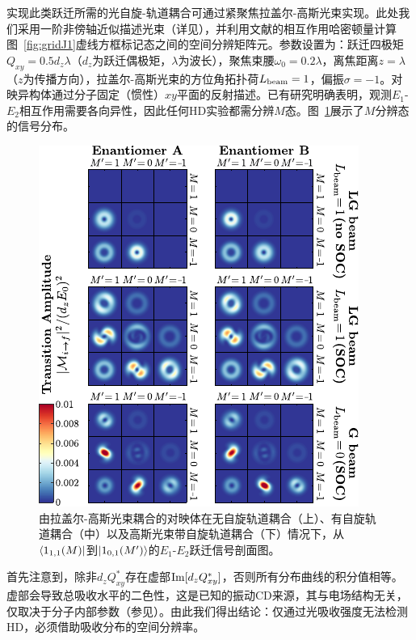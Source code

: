 \documentclass[reprint,aps,prl,twocolumn,superscriptaddress,groupedaddress]{revtex4-2}
\newcommand{\eoet}{$E_1$-$E_2$}
\begin{document}
\begin{CJK*}{UTF8}{gbsn}
实现此类跃迁所需的光自旋-轨道耦合可通过紧聚焦拉盖尔-高斯光束实现\cite{Loeffler2011,Forbes2021nonparaxial,Forbes2021longitudinal}。此处我们采用一阶非傍轴近似描述光束\cite{Lax1975}（详见\cite{Note1}），并利用文献\cite{Maslov2024,Maslov_Thesis}的相互作用哈密顿量计算图~\ref{fig:gridJ1}虚线方框标记态之间的空间分辨矩阵元。参数设置为：跃迁四极矩$Q_{xy}=0.5d_z\lambda$（$d_z$为跃迁偶极矩，$\lambda$为波长），聚焦束腰$\omega_0=0.2\lambda$，离焦距离$z=\lambda$（$z$为传播方向），拉盖尔-高斯光束的方位角拓扑荷$L_{\rm beam}=1$，偏振$\sigma=-1$。对映异构体通过分子固定（惯性）$xy$平面的反射描述。已有研究明确表明\cite{Buckingham1971, Power1975}，观测\eoet 相互作用需要各向异性，因此任何HD实验都需分辨$M$态。图~\ref{fig:profiles}展示了$M$分辨态的信号分布。
\begin{figure}[t!]
    \centering
    \includegraphics[width=1.0\columnwidth]{Figure2.pdf}
    \caption{由拉盖尔-高斯光束耦合的对映体在无自旋轨道耦合（上）、有自旋轨道耦合（中）以及高斯光束带自旋轨道耦合（下）情况下，从$\bra{1_{1,1}(M)}$到$\ket{1_{0,1}(M')}$的\eoet 跃迁信号剖面图。}
    \label{fig:profiles}
\end{figure}
首先注意到，除非$d_zQ_{xy}^*$存在虚部${\rm Im}[d_zQ_{xy}^*]$，否则所有分布曲线的积分值相等。虚部会导致总吸收水平的二色性，这是已知的振动CD来源，其与电场结构无关，仅取决于分子内部参数（参见\cite{Buckingham1971}）。由此我们得出结论：仅通过光吸收强度无法检测HD，必须借助吸收分布的空间分辨率\cite{Loeffler2011}。


\end{CJK*}
\end{document}
